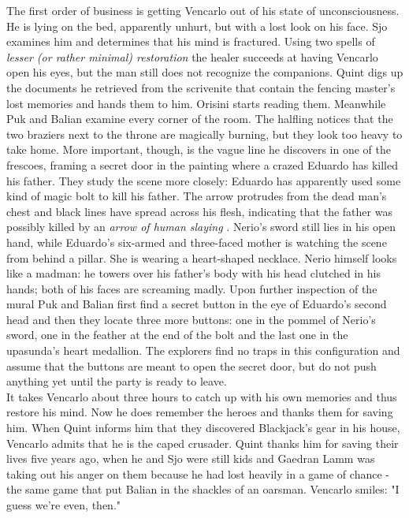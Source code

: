 The first order of business is getting Vencarlo out of his state of unconsciousness. He is lying on the bed, apparently unhurt, but with a lost look on his face. Sjo examines him and determines that his mind is fractured. Using two spells of {\itshape lesser (or rather minimal) restoration} the healer succeeds at having Vencarlo open his eyes, but the man still does not recognize the companions. Quint digs up the documents he retrieved from the scrivenite that contain the fencing master's lost memories and hands them to him. Orisini starts reading them. Meanwhile Puk and Balian examine every corner of the room. The halfling notices that the two braziers next to the throne are magically burning, but they look too heavy to take home. More important, though, is the vague line he discovers in one of the frescoes, framing a secret door in the painting where a crazed Eduardo has killed his father. They study the scene more closely: Eduardo has apparently used some kind of magic bolt to kill his father. The arrow protrudes from the dead man's chest and black lines have spread across his flesh, indicating that the father was possibly killed by an {\itshape arrow of human slaying} . Nerio's sword still lies in his open hand, while Eduardo's six-armed and three-faced mother is watching the scene from behind a pillar. She is wearing a heart-shaped necklace. Nerio himself looks like a madman: he towers over his father's body with his head clutched in his hands; both of his faces are screaming madly. Upon further inspection of the mural Puk and Balian first find a secret button in the eye of Eduardo's second head and then they locate three more buttons: one in the pommel of Nerio's sword, one in the feather at the end of the bolt and the last one in the upasunda's heart medallion. The explorers find no traps in this configuration and assume that the buttons are meant to open the secret door, but do not push anything yet until the party is ready to leave.\\

It takes Vencarlo about three hours to catch up with his own memories and thus restore his mind. Now he does remember the heroes and thanks them for saving him. When Quint informs him that they discovered Blackjack's gear in his house, Vencarlo admits that he is the caped crusader. Quint thanks him for saving their lives five years ago, when he and Sjo were still kids and Gaedran Lamm was taking out his anger on them because he had lost heavily in a game of chance - the same game that put Balian in the shackles of an oarsman. Vencarlo smiles: "I guess we're even, then."\\

